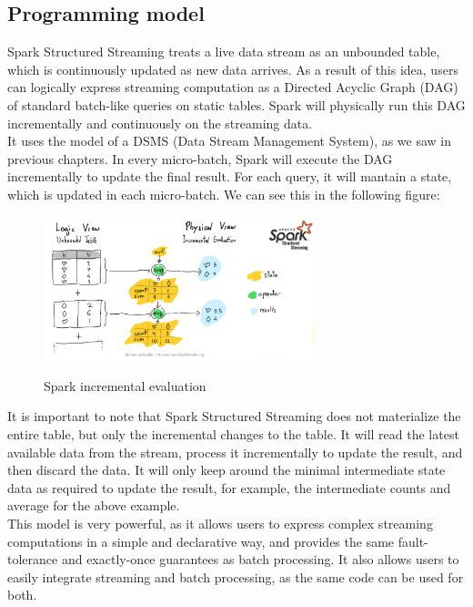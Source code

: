 \subsection{Programming model}

Spark Structured Streaming treats a live data stream as an unbounded table, which is continuously
updated as new data arrives. As a result of this idea, users can logically express streaming computation
as a Directed Acyclic Graph (DAG) of standard batch-like queries on static tables. Spark will physically
run this DAG incrementally and continuously on the streaming data.\\

It uses the model of a DSMS (Data Stream Management System), as we saw in previous chapters. In every 
micro-batch, Spark will execute the DAG incrementally to update the final result. For each query, it will
mantain a state, which is updated in each micro-batch. We can see this in the following figure:

\begin{figure}[H]
    \centering
    \includegraphics[width=0.7\textwidth]{figures/spark_increm_eval.png}
    \label{fig:spark_increm_eval}
    \caption{Spark incremental evaluation}
\end{figure}

It is important to note that Spark Structured Streaming does not materialize the entire table,
but only the incremental changes to the table. It will read the latest available data from the
stream, process it incrementally to update the result, and then discard the data. It will only
keep around the minimal intermediate state data as required to update the result, for example,
the intermediate counts and average for the above example.\\

This model is very powerful, as it allows users to express complex streaming computations in a
simple and declarative way, and provides the same fault-tolerance and exactly-once guarantees
as batch processing. It also allows users to easily integrate streaming and batch processing,
as the same code can be used for both.

